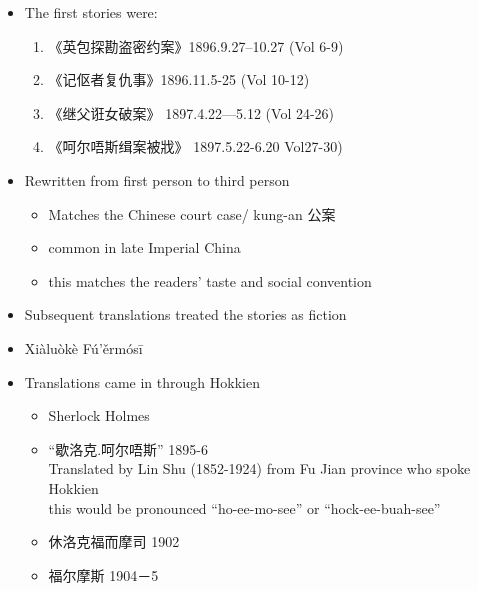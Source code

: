 \documentclass[a4paper,landscape,headrule,footrule,xetex]{foils}
\begin{document}
\begin{itemize}\addtolength{\itemsep}{-1ex}
\item The first stories were:
  \begin{enumerate}
  \item 《英包探勘盗密约案》1896.9.27--10.27 (Vol 6-9) 
  \item  《记伛者复仇事》1896.11.5-25 (Vol 10-12)   
  \item  《继父诳女破案》 1897.4.22—5.12 (Vol 24-26) 
\item  《呵尔唔斯缉案被戕》 1897.5.22-6.20 Vol27-30) 
\end{enumerate}
\item  Rewritten from first person to third person
  \begin{itemize}
  \item Matches the Chinese court case/ kung-an 公案
  \item common in late Imperial China
  \item this matches the readers' taste and social convention
  \end{itemize}
\item Subsequent translations treated the stories as fiction

\end{itemize}


\begin{itemize}
\item Xiàluòkè Fú'ěrmósī
\item Translations came in through Hokkien
  \begin{itemize}
  \item Sherlock Holmes 
  \item “歇洛克.呵尔唔斯” 1895-6
\\ Translated by Lin Shu (1852-1924) from Fu Jian province who spoke
Hokkien
\\ this would be pronounced  “ho-ee-mo-see” or “hock-ee-buah-see”
  \item  休洛克福而摩司 1902
  \item  福尔摩斯 1904－5
  \end{itemize}
\end{itemize}
\end{document}
